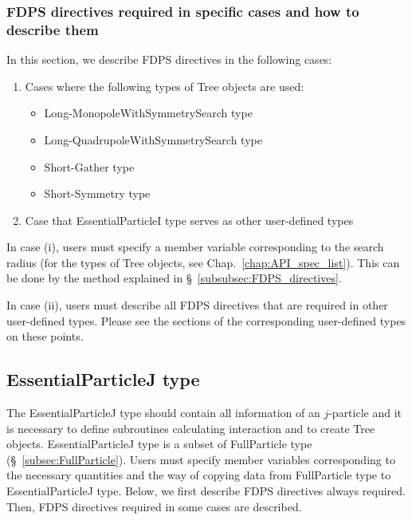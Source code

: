 \subsubsection{FDPS directives required in specific cases and how to describe them}
\label{sec:EPI:FDPS_directives_required_in_specific_cases}
In this section, we describe FDPS directives in the following cases:
\begin{enumerate}[leftmargin=*,itemsep=-1ex,label=(\roman*)]
\item Cases where the following types of Tree objects are used:
\begin{itemize}
\item Long-MonopoleWithSymmetrySearch type
\item Long-QuadrupoleWithSymmetrySearch type
\item Short-Gather type
\item Short-Symmetry type
\end{itemize}
\item Case that EssentialParticleI type serves as other user-defined types
\end{enumerate}

In case (i), users must specify a member variable corresponding to the search radius (for the types of Tree objects, see Chap.~\ref{chap:API_spec_list}). This can be done by the method explained in \S~\ref{subsubsec:FDPS_directives}.

In case (ii), users must describe all FDPS directives that are required in other user-defined types. Please see the sections of the corresponding user-defined types on these points.


\subsection{EssentialParticleJ type}
\label{subsec:EssentialParticleJ}
The EssentialParticleJ type should contain all information of an $j$-particle and it is necessary to define subroutines calculating interaction and to create Tree objects. EssentialParticleJ type is a subset of FullParticle type (\S~\ref{subsec:FullParticle}). Users must specify member variables corresponding to the necessary quantities and the way of copying data from FullParticle type to EssentialParticleJ type. Below, we first describe FDPS directives always required. Then, FDPS directives required in some cases are described.

